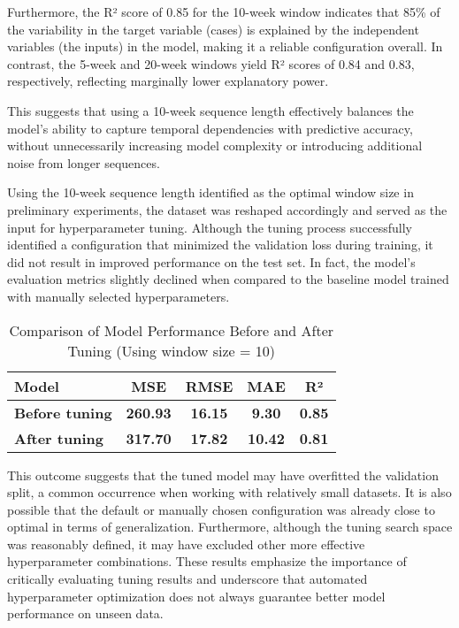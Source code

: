 Furthermore, the R² score of 0.85 for the 10-week window indicates that 85\% of the variability in the target variable (cases) is explained by the independent variables (the inputs) in the model, making it a reliable configuration overall. In contrast, the 5-week and 20-week windows yield R² scores of 0.84 and 0.83, respectively, reflecting marginally lower explanatory power.

This suggests that using a 10-week sequence length effectively balances the model’s ability to capture temporal dependencies with predictive accuracy, without unnecessarily increasing model complexity or introducing additional noise from longer sequences.

Using the 10-week sequence length identified as the optimal window size in preliminary experiments, the dataset was reshaped accordingly and served as the input for hyperparameter tuning. Although the tuning process successfully identified a configuration that minimized the validation loss during training, it did not result in improved performance on the test set. In fact, the model’s evaluation metrics slightly declined when compared to the baseline model trained with manually selected hyperparameters.

\begin{table}[h!]
	\centering
	\begin{tabular}{|l|c|c|c|c|}
		\hline
		\textbf{Model} & \textbf{MSE} & \textbf{RMSE} & \textbf{MAE} & \textbf{R²}\\ \hline
		\textbf{Before tuning} & \textbf{260.93} & \textbf{16.15} & \textbf{9.30} & \textbf{0.85}\\ \hline
		\textbf{After tuning} & \textbf{317.70} & \textbf{17.82} & \textbf{10.42} &\textbf{0.81}\\ \hline
	\end{tabular}
	\caption{Comparison of Model Performance Before and After Tuning (Using window size = 10)}
	\label{tab:comparison_of_tuning}
\end{table}

This outcome suggests that the tuned model may have overfitted the validation split, a common occurrence when working with relatively small datasets. It is also possible that the default or manually chosen configuration was already close to optimal in terms of generalization. Furthermore, although the tuning search space was reasonably defined, it may have excluded other more effective hyperparameter combinations. These results emphasize the importance of critically evaluating tuning results and underscore that automated hyperparameter optimization does not always guarantee better model performance on unseen data.


